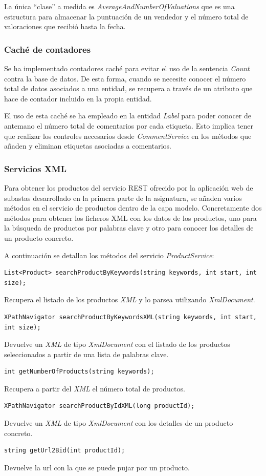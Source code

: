 \documentclass{article}
\begin{document}
	La única ``clase'' a medida es \emph{AverageAndNumberOfValuations} que es una estructura para almacenar la puntuación de un vendedor y el número total de valoraciones que recibió hasta la fecha.

\subsubsection{Caché de contadores}
	Se ha implementado contadores caché para evitar el uso de la sentencia \emph{Count} contra la base de datos. De esta forma, cuando se necesite conocer el número total de datos asociados a una entidad, se recupera a través de un atributo que hace de contador incluido en la propia entidad.
	
	El uso de esta caché se ha empleado en la entidad \emph{Label} para poder conocer de antemano el número total de comentarios por cada etiqueta. Esto implica tener que realizar los controles necesarios desde \emph{CommentService} en los métodos que añaden y eliminan etiquetas asociadas a comentarios.
	
\subsubsection{Servicios XML}
	Para obtener los productos del servicio REST ofrecido por la aplicación web de subastas desarrollado en la primera parte de la asignatura, se añaden varios métodos en el servicio de productos dentro de la capa modelo. Concretamente dos métodos para obtener los ficheros XML con los datos de los productos, uno para la búsqueda de productos por palabras clave y otro para conocer los detalles de un producto concreto.
	
	A continuación se detallan los métodos del servicio \emph{ProductService}:
\begin{lstlisting}[style=sharpc]
 List<Product> searchProductByKeywords(string keywords, int start, int size);
\end{lstlisting}
	Recupera el listado de los productos \emph{XML} y lo parsea utilizando \emph{XmlDocument}.
\begin{lstlisting}[style=sharpc]
 XPathNavigator searchProductByKeywordsXML(string keywords, int start, int size);
\end{lstlisting}
	Devuelve un \emph{XML} de tipo \emph{XmlDocument} con el listado de los productos seleccionados a partir de una lista de palabras clave.
\begin{lstlisting}[style=sharpc]
 int getNumberOfProducts(string keywords);
\end{lstlisting}
	Recupera a partir del \emph{XML} el número total de productos. 
\begin{lstlisting}[style=sharpc]
 XPathNavigator searchProductByIdXML(long productId);
\end{lstlisting}
	Devuelve un \emph{XML} de tipo \emph{XmlDocument} con los detalles de un producto concreto.
\begin{lstlisting}[style=sharpc]
 string getUrl2Bid(int productId);
\end{lstlisting}
	Devuelve la url con la que se puede pujar por un producto.
	
\end{document}
